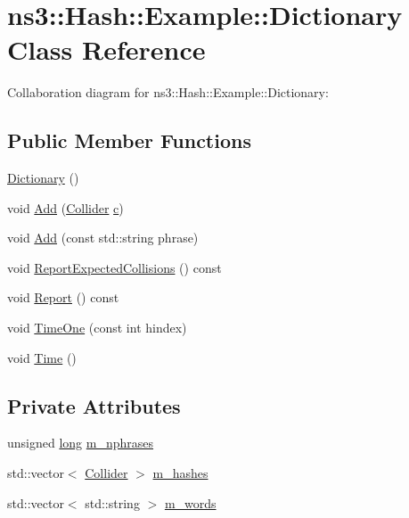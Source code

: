 \hypertarget{classns3_1_1Hash_1_1Example_1_1Dictionary}{}\section{ns3\+:\+:Hash\+:\+:Example\+:\+:Dictionary Class Reference}
\label{classns3_1_1Hash_1_1Example_1_1Dictionary}


Collaboration diagram for ns3\+:\+:Hash\+:\+:Example\+:\+:Dictionary\+:
\subsection*{Public Member Functions}
\begin{DoxyCompactItemize}
\item 
\hyperlink{classns3_1_1Hash_1_1Example_1_1Dictionary_a6764e9df469c280e952bef5ccf4378ae}{Dictionary} ()
\item 
void \hyperlink{classns3_1_1Hash_1_1Example_1_1Dictionary_a091918961277b192b334cd5241f1c660}{Add} (\hyperlink{classns3_1_1Hash_1_1Example_1_1Collider}{Collider} \hyperlink{mmwave_2model_2fading-traces_2fading__trace__generator_8m_ae0323a9039add2978bf5b49550572c7c}{c})
\item 
void \hyperlink{classns3_1_1Hash_1_1Example_1_1Dictionary_ae4e86103ddc1a6b9ec5322f711f99aa5}{Add} (const std\+::string phrase)
\item 
void \hyperlink{classns3_1_1Hash_1_1Example_1_1Dictionary_a387929aeacbd5b9c8fdf7f0e351ef16e}{Report\+Expected\+Collisions} () const 
\item 
void \hyperlink{classns3_1_1Hash_1_1Example_1_1Dictionary_aabb6449a0507d883d7c786b03d5d07d8}{Report} () const 
\item 
void \hyperlink{classns3_1_1Hash_1_1Example_1_1Dictionary_afd4ca23d992aa625d4c35ce4f42b611c}{Time\+One} (const int hindex)
\item 
void \hyperlink{classns3_1_1Hash_1_1Example_1_1Dictionary_ae863340110d978b98e6608c15cf01d09}{Time} ()
\end{DoxyCompactItemize}
\subsection*{Private Attributes}
\begin{DoxyCompactItemize}
\item 
unsigned \hyperlink{generate__test__data__lte__sinr_8m_a0eab6be67e93c3411f7a8b53cc297285}{long} \hyperlink{classns3_1_1Hash_1_1Example_1_1Dictionary_a9b178dadc9f65ac92d4be0e0cee4eea8}{m\+\_\+nphrases}
\item 
std\+::vector$<$ \hyperlink{classns3_1_1Hash_1_1Example_1_1Collider}{Collider} $>$ \hyperlink{classns3_1_1Hash_1_1Example_1_1Dictionary_a5e564c355e42a6db27cb8a8d756dfecd}{m\+\_\+hashes}
\item 
std\+::vector$<$ std\+::string $>$ \hyperlink{classns3_1_1Hash_1_1Example_1_1Dictionary_a514e44a90c8fd635bfa98501531e088d}{m\+\_\+words}
\end{DoxyCompactItemize}



